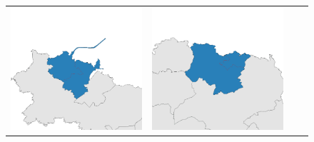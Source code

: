 \begin{figure}[p]
\begin{tabularx}{1\textwidth}{XXXX}
\includegraphics[width=1\linewidth]{images/ch6/mergefocus/05}&
\includegraphics[width=1\linewidth]{images/ch6/mergefocus/06}&

\end{tabularx}
\end{figure}
